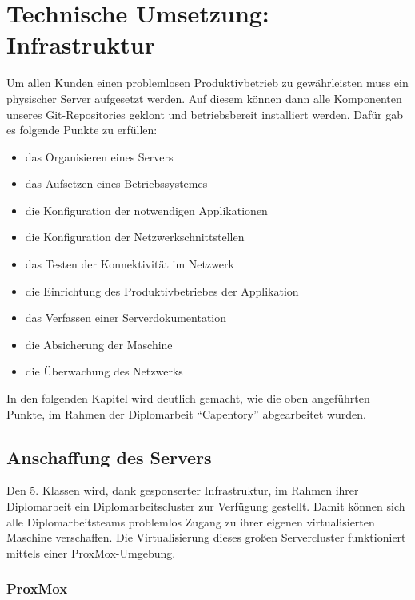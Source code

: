 \hypertarget{technische-umsetzung-infrastruktur}{%
\section{Technische Umsetzung:
Infrastruktur}\label{technische-umsetzung-infrastruktur}}

Um allen Kunden einen problemlosen Produktivbetrieb zu gewährleisten
muss ein physischer Server aufgesetzt werden. Auf diesem können dann
alle Komponenten unseres Git-Repositories geklont und betriebsbereit
installiert werden. Dafür gab es folgende Punkte zu erfüllen:

\begin{itemize}
\tightlist
\item
  das Organisieren eines Servers
\item
  das Aufsetzen eines Betriebssystemes
\item
  die Konfiguration der notwendigen Applikationen
\item
  die Konfiguration der Netzwerkschnittstellen
\item
  das Testen der Konnektivität im Netzwerk
\item
  die Einrichtung des Produktivbetriebes der Applikation
\item
  das Verfassen einer Serverdokumentation
\item
  die Absicherung der Maschine
\item
  die Überwachung des Netzwerks
\end{itemize}

In den folgenden Kapitel wird deutlich gemacht, wie die oben angeführten
Punkte, im Rahmen der Diplomarbeit ``Capentory'' abgearbeitet wurden.

\hypertarget{anschaffung-des-servers}{%
\subsection{Anschaffung des Servers}\label{anschaffung-des-servers}}

Den 5. Klassen wird, dank gesponserter Infrastruktur, im Rahmen ihrer
Diplomarbeit ein Diplomarbeitscluster zur Verfügung gestellt. Damit
können sich alle Diplomarbeitsteams problemlos Zugang zu ihrer eigenen
virtualisierten Maschine verschaffen. Die Virtualisierung dieses großen
Servercluster funktioniert mittels einer ProxMox-Umgebung.

\hypertarget{proxmox}{%
\subsubsection{ProxMox}\label{proxmox}}

